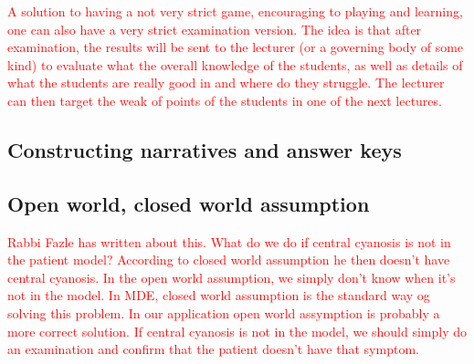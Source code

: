 


\textcolor{red}{A solution to having a not very strict game, encouraging to playing and learning, one can also have a very strict examination version. The idea is that after examination, the results will be sent to the lecturer (or a governing body of some kind) to evaluate what the overall knowledge of the students, as well as details of what the students are really good in and where do they struggle. The lecturer can then target the weak of points of the students in one of the next lectures. }

\subsection{Constructing narratives and answer keys}

\subsection{Open world, closed world assumption}
\textcolor{red}{Rabbi Fazle has written about this. What do we do if central cyanosis is not in the patient model? According to closed world assumption he then doesn't have central cyanosis. In the open world assumption, we simply don't know when it's not in the model. In MDE, closed world assumption is the standard way og solving this problem. In our application open world assymption is probably a more correct solution. If central cyanosis is not in the model, we should simply do an examination and confirm that the patient doesn't have that symptom.}

